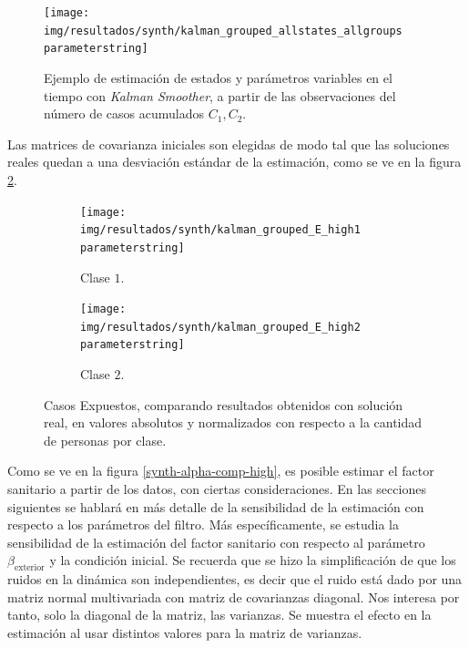 \begin{figure}[!h]
\centering
\texttt{[image: img/resultados/synth/kalman\_grouped\_allstates\_allgroups\\parameterstring]}
\caption{Ejemplo de estimación de estados y parámetros variables en el tiempo con \textit{Kalman Smoother}, a partir de las observaciones del número de casos acumulados \(C_1, C_2\).}
\label{synth-all-nohigh}
\end{figure}

Las matrices de covarianza iniciales son elegidas de modo tal que las soluciones reales quedan a una desviación estándar de la estimación, como se ve en la figura \ref{synth-e-comp-high}.


\begin{figure}[!h]
     \centering
     \begin{subfigure}[b]{\textwidth}
         \centering
         \texttt{[image: img/resultados/synth/kalman\_grouped\_E\_high1\\parameterstring]}
         \caption{Clase \(1\).}
     \end{subfigure}
     \hfill
     \begin{subfigure}[b]{\textwidth}
         \centering
         \texttt{[image: img/resultados/synth/kalman\_grouped\_E\_high2\\parameterstring]}
         \caption{Clase \(2\).}
     \end{subfigure}
        \caption{Casos Expuestos, comparando resultados obtenidos con solución real, en valores absolutos y normalizados con respecto a la cantidad de personas por clase.}
        \label{synth-e-comp-high}
\end{figure}


Como se ve en la figura \ref{synth-alpha-comp-high}, es posible estimar el factor sanitario a partir de los datos, con ciertas consideraciones. En las secciones siguientes  se hablará en más detalle de la sensibilidad de la estimación con respecto a los parámetros del filtro. Más específicamente, se estudia la sensibilidad de la estimación del factor sanitario con respecto al parámetro \(\beta_{\text{exterior}}\) y la condición inicial. Se recuerda que se hizo la simplificación de que los ruidos en la dinámica son independientes, es decir que el ruido está dado por una matriz normal multivariada con matriz de covarianzas diagonal. Nos interesa por tanto, solo la diagonal de la matriz, las varianzas. Se muestra el efecto en la estimación al usar distintos valores para la matriz de varianzas.

